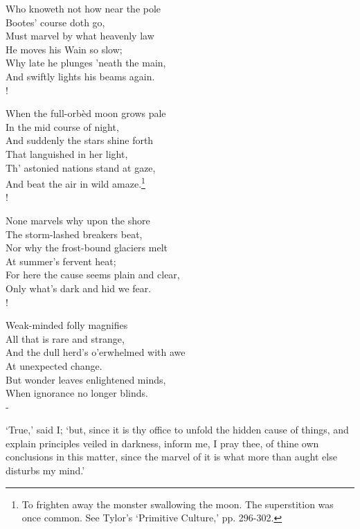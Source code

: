 \documentclass[12pt]{book}
\newenvironment{vpoem}[1]%
  {\def\poemvsindentlines{#1}\begin{poem}\small}%
  {\end{poem}\def\poemvsindentlines{\relax}}
\begin{document}
\begin{vpoem}{24}
    Who knoweth not how near the pole \\
      Bootes' course doth go, \\
    Must marvel by what heavenly law \\
      He moves his Wain so slow; \\
    Why late he plunges 'neath the main, \\
    And swiftly lights his beams again. \\!

    When the full-orbèd moon grows pale \\
      In the mid course of night, \\
    And suddenly the stars shine forth \\
      That languished in her light, \\
    Th' astonied nations stand at gaze, \\
    And beat the air in wild amaze.\footnote{To frighten away the monster swallowing the moon. The superstition was once common. See Tylor's `Primitive Culture,' pp. 296-302.} \\!

    None marvels why upon the shore \\
      The storm-lashed breakers beat, \\
    Nor why the frost-bound glaciers melt \\
      At summer's fervent heat; \\
    For here the cause seems plain and clear, \\
    Only what's dark and hid we fear. \\!

    Weak-minded folly magnifies \\
      All that is rare and strange, \\
    And the dull herd's o'erwhelmed with awe \\
      At unexpected change. \\
    But wonder leaves enlightened minds, \\
    When ignorance no longer blinds. \\-
\end{vpoem}

`True,' said I; `but, since it is thy office to unfold the hidden cause
of things, and explain principles veiled in darkness, inform me, I pray
thee, of thine own conclusions in this matter, since the marvel of it is
what more than aught else disturbs my mind.'
\end{document}
